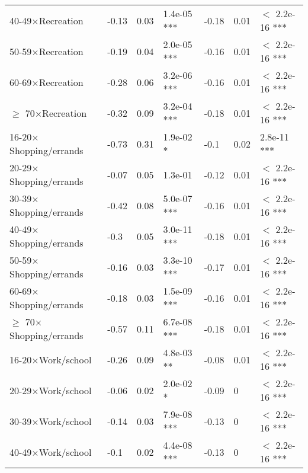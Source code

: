\documentclass{article}\usepackage[utf8]{inputenc}
\begin{document}
\begin{longtable}[t]{lllllll}
\hspace{1em}40-49$\times$Recreation & -0.13 & 0.03 & 1.4e-05 *** & -0.18 & 0.01 & $<$ 2.2e-16 ***\\
\hspace{1em}50-59$\times$Recreation & -0.19 & 0.04 & 2.0e-05 *** & -0.16 & 0.01 & $<$ 2.2e-16 ***\\
\hspace{1em}60-69$\times$Recreation & -0.28 & 0.06 & 3.2e-06 *** & -0.16 & 0.01 & $<$ 2.2e-16 ***\\
\hspace{1em}$\geq$ 70$\times$Recreation & -0.32 & 0.09 & 3.2e-04 *** & -0.18 & 0.01 & $<$ 2.2e-16 ***\\
\hspace{1em}16-20$\times$Shopping/errands & -0.73 & 0.31 & 1.9e-02 * & -0.1 & 0.02 & 2.8e-11 ***\\
\hspace{1em}20-29$\times$Shopping/errands & -0.07 & 0.05 & 1.3e-01 & -0.12 & 0.01 & $<$ 2.2e-16 ***\\
\hspace{1em}30-39$\times$Shopping/errands & -0.42 & 0.08 & 5.0e-07 *** & -0.16 & 0.01 & $<$ 2.2e-16 ***\\
\hspace{1em}40-49$\times$Shopping/errands & -0.3 & 0.05 & 3.0e-11 *** & -0.18 & 0.01 & $<$ 2.2e-16 ***\\
\hspace{1em}50-59$\times$Shopping/errands & -0.16 & 0.03 & 3.3e-10 *** & -0.17 & 0.01 & $<$ 2.2e-16 ***\\
\hspace{1em}60-69$\times$Shopping/errands & -0.18 & 0.03 & 1.5e-09 *** & -0.16 & 0.01 & $<$ 2.2e-16 ***\\
\hspace{1em}$\geq$ 70$\times$Shopping/errands & -0.57 & 0.11 & 6.7e-08 *** & -0.18 & 0.01 & $<$ 2.2e-16 ***\\
\hspace{1em}16-20$\times$Work/school & -0.26 & 0.09 & 4.8e-03 ** & -0.08 & 0.01 & $<$ 2.2e-16 ***\\
\hspace{1em}20-29$\times$Work/school & -0.06 & 0.02 & 2.0e-02 * & -0.09 & 0 & $<$ 2.2e-16 ***\\
\hspace{1em}30-39$\times$Work/school & -0.14 & 0.03 & 7.9e-08 *** & -0.13 & 0 & $<$ 2.2e-16 ***\\
\hspace{1em}40-49$\times$Work/school & -0.1 & 0.02 & 4.4e-08 *** & -0.13 & 0 & $<$ 2.2e-16 ***\\

\end{longtable}
\end{document}
